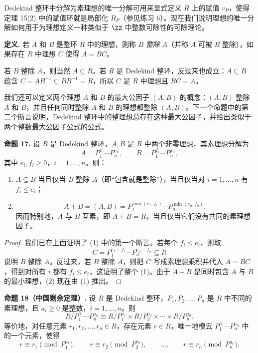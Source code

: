 Dedekind 整环中分解为素理想的唯一分解可用来显式定义 $R$ 上的赋值 $v_P$，使得定理 15(2) 中的赋值环就是局部化 $R_P$（参见练习 6）。现在我们说明理想的唯一分解如何用于为理想定义一种类似于 $\ZZ$ 中整数可除性的可除理论。

\noindent\textbf{定义.} 若 $A$ 和 $B$ 是整环 $R$ 中的理想，则称 $B$ \emph{整除} $A$（并称 $A$ 可被 $B$ 整除），如果存在 $R$ 中理想 $C$ 使得 $A=BC$。

若 $B$ 整除 $A$，则当然 $A\subseteq B$。若 $R$ 是 Dedekind 整环，反过来也成立：$A\subseteq B$ 蕴含 $C=AB^{-1}\subseteq BB^{-1}=R$，所以 $C$ 是 $R$ 中理想且 $BC=A$。

我们还可以定义两个理想 $A$ 和 $B$ 的最大公因子 $(A,B)$ 的概念：$(A,B)$ 整除 $A$ 和 $B$，并且任何同时整除 $A$ 和 $B$ 的理想都整除 $(A,B)$。下一个命题中的第二个断言说明，Dedekind 整环中的整理想总存在这种最大公因子，并给出类似于两个整数最大公因子公式的公式。

\medskip
\noindent\textbf{命题 17.} 设 $R$ 是 Dedekind 整环，$A,B$ 是 $R$ 中两个非零理想，其素理想分解为
\[
  A=P_1^{e_1}\cdots P_n^{e_n},
  \qquad
  B=P_1^{f_1}\cdots P_n^{f_n},
\]
其中 $e_i,f_i\geq0$，$i=1,
\ldots,n$。则：
\begin{enumerate}[label=(\arabic*)]
  \item $A\subseteq B$ 当且仅当 $B$ 整除 $A$（即“包含就是整除”），当且仅当对 $i=1,
  \ldots,n$ 有 $f_i\leq e_i$；
  \item
  \[
    A+B=(A,B)=P_1^{\min(e_1,f_1)}\cdots P_n^{\min(e_n,f_n)},
  \]
  因而特别地，$A$ 与 $B$ 互素，即 $A+B=R$，当且仅当它们没有共同的素理想因子。
\end{enumerate}

\begin{proof}
我们已在上面证明了 (1) 中的第一个断言。若每个 $f_i\leq e_i$，则取
\[
  C=P_1^{e_1-f_1}\cdots P_n^{e_n-f_n}\subseteq R
\]
说明 $B$ 整除 $A$。反过来，若 $B$ 整除 $A$，则把 $C$ 写成素理想乘积并代入 $A=BC$，得到对所有 $i$ 都有 $f_i\leq e_i$，这证明了整个 (1)。由于 $A+B$ 是同时包含 $A$ 与 $B$ 的最小理想，(2) 现在由 (1) 推出。
\end{proof}

\medskip
\noindent\textbf{命题 18（中国剩余定理）.} 设 $R$ 是 Dedekind 整环，$P_1,P_2,
\ldots,P_n$ 是 $R$ 中不同的素理想，且 $a_i\geq0$ 是整数，$i=1,
\ldots,n$。则
\[
  R/P_1^{a_1}\cdots P_n^{a_n}
  \cong R/P_1^{a_1}\times R/P_2^{a_2}\times\cdots\times R/P_n^{a_n}.
\]
等价地，对任意元素 $r_1,r_2,
\ldots,r_n\in R$，存在元素 $r\in R$，唯一地模去 $P_1^{a_1}\cdots P_n^{a_n}$ 中的一个元素，使得
\[
  r\equiv r_1\pmod{P_1^{a_1}},
  \qquad
  r\equiv r_2\pmod{P_2^{a_2}},
  \qquad
  \ldots,
  \qquad
  r\equiv r_n\pmod{P_n^{a_n}}.
\]


